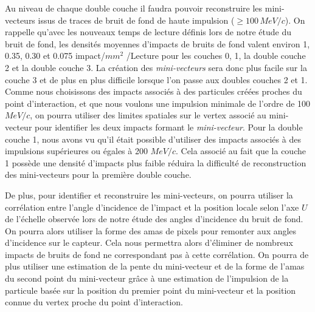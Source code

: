    \medskip
   
   Au niveau de chaque double couche il faudra pouvoir reconstruire les mini-vecteurs issus de traces de bruit de fond de haute impulsion ($\geq 100 \, MeV/c$). On rappelle qu'avec les nouveaux temps de lecture d\'efinis lors de notre \'etude du bruit de fond, les densit\'es moyennes d'impacts de bruits de fond valent environ 1, 0.35, 0.30 et 0.075 impact/$mm^2$ /Lecture pour les couches 0, 1, la double couche 2 et la double couche 3. La cr\'eation des \textit{mini-vecteurs} sera donc plus facile sur la couche 3 et de plus en plus difficile lorsque l'on passe aux doubles couches 2 et 1. Comme nous choisissons des impacts associ\'es \`a des particules cr\'e\'ees proches du point d'interaction, et que nous voulons une impulsion minimale de l'ordre de 100 $MeV/c$, on pourra utiliser des limites spatiales sur le vertex associ\'e au mini-vecteur pour identifier les deux impacts formant le \textit{mini-vecteur}. Pour la double couche 1, nous avons vu qu'il \'etait possible d'utiliser des impacts associ\'es \`a des impulsions sup\'erieures ou \'egales \`a 200 $MeV/c$. Cela associ\'e au fait que la couche 1 poss\`ede une densit\'e d'impacts plus faible r\'eduira la difficult\'e de reconstruction des mini-vecteurs pour la premi\`ere double couche.
   
   \medskip
   
   De plus, pour identifier et reconstruire les mini-vecteurs, on pourra utiliser la corr\'elation entre l'angle d'incidence de l'impact et la position locale selon l'axe $U$ de l'\'echelle observ\'ee lors de notre \'etude des angles d'incidence du bruit de fond. On pourra alors utiliser la forme des amas de pixels pour remonter aux angles d'incidence sur le capteur. Cela nous permettra alors d'éliminer de nombreux impacts de bruits de fond ne correspondant pas \`a cette corr\'elation. On pourra de plus utiliser une estimation de la pente du mini-vecteur et de la forme de l'amas du second point du mini-vecteur gr\^ace \`a une estimation de l'impulsion de la particule bas\'ee sur la position du premier point du mini-vecteur et la position connue du vertex proche du point d'interaction.
   
%    
   
